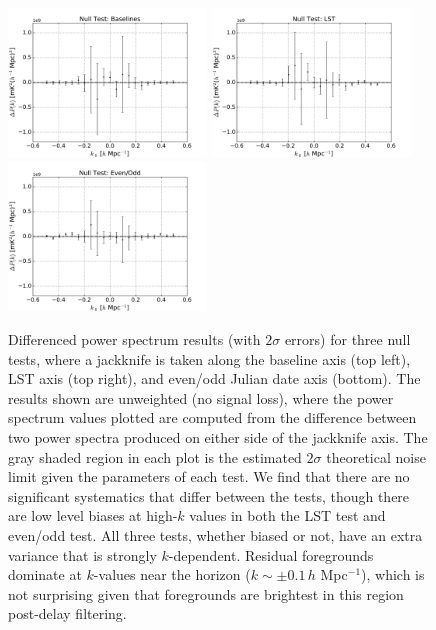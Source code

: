 \documentclass[preprint2,numberedappendix,tighten]{aastex6}
\begin{document}
\begin{figure}
	\centering
	\includegraphics[width=0.47\textwidth]{plots/null_bls.pdf}
	\includegraphics[width=0.47\textwidth]{plots/null_lsts.pdf}
	\includegraphics[width=0.47\textwidth]{plots/null_eo.pdf}
	\caption{Differenced power spectrum results (with $2\sigma$ errors) for three null tests, where a jackknife is taken along the baseline axis (top left), LST axis (top right), and even/odd Julian date axis (bottom). The results shown are unweighted (no signal loss), where the power spectrum values plotted are computed from the difference between two power spectra produced on either side of the jackknife axis. The gray shaded region in each plot is the estimated $2\sigma$ theoretical noise limit given the parameters of each test. We find that there are no significant systematics that differ between the tests, though there are low level biases at high-$k$ values in both the LST test and even/odd test. All three tests, whether biased or not, have an extra variance that is strongly $k$-dependent. Residual foregrounds dominate at $k$-values near the horizon ($k\sim\pm 0.1$\,$h$ Mpc$^{-1}$), which is not surprising given that foregrounds are brightest in this region post-delay filtering.}
	\label{fig:null}
\end{figure}
\end{document}
